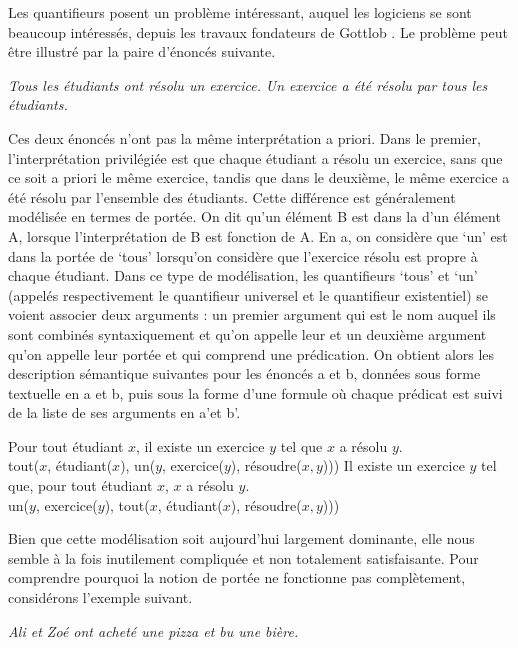 {Les quantifieurs posent un problème intéressant, auquel les logiciens se sont beaucoup intéressés, depuis les travaux fondateurs de Gottlob \citet{frege1892uber}. Le problème peut être illustré par la paire d’énoncés suivante.

\ea\label{ex:13-portée}
\ea \textit{Tous les étudiants ont résolu un exercice.}
\ex \textit{Un exercice a été résolu par tous les étudiants.}\z\z

Ces deux énoncés n’ont pas la même interprétation a priori. Dans le premier, l’interprétation privilégiée est que chaque étudiant a résolu un exercice, sans que ce soit a priori le même exercice, tandis que dans le deuxième, le même exercice a été résolu par l’ensemble des étudiants. Cette différence est généralement modélisée en termes de portée. On dit qu’un élément B est dans la  d’un élément A, lorsque l’interprétation de B est fonction de A. En a, on considère que ‘un’ est dans la portée de ‘tous’ lorsqu’on considère que l’exercice résolu est propre à chaque étudiant. Dans ce type de modélisation, les quantifieurs ‘tous’ et ‘un’ (appelés respectivement le quantifieur universel et le quantifieur existentiel) se voient associer deux arguments : un premier argument qui est le nom auquel ils sont combinés syntaxiquement et qu’on appelle leur  et un deuxième argument qu’on appelle leur portée et qui comprend une prédication. On obtient alors les description sémantique suivantes pour les énoncés a et b, données sous forme textuelle en a et b, puis sous la forme d’une formule où chaque prédicat est suivi de la liste de ses arguments en a’et b’.

\ea\label{ex:13-scope}
\ea Pour tout étudiant $x$, il existe un exercice $y$ tel que $x$ a résolu $y$.\\
tout($x$, étudiant($x$), un($y$, exercice($y$), résoudre($x,y$)))
\ex Il existe un exercice $y$ tel que, pour tout étudiant $x$, $x$ a résolu $y$.\\
un($y$, exercice($y$), tout($x$, étudiant($x$), résoudre($x,y$)))\z\z

Bien que cette modélisation soit aujourd’hui largement dominante, elle nous semble à la fois inutilement compliquée et non totalement satisfaisante. Pour comprendre pourquoi la notion de portée ne fonctionne pas complètement, considérons l’exemple suivant.

\ea\label{ex:13-pizza} \textit{Ali et Zoé ont acheté une pizza et bu une bière.}\z

}
